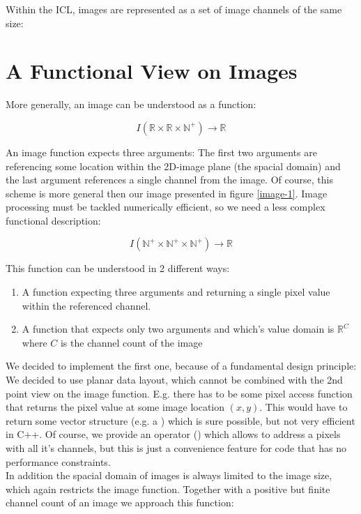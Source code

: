  Within the ICL, images are represented as a set of image channels of the same size:



\section{A Functional View on Images}
More generally, an image can be understood as a function:

\begin{equation}
I(\mathbb{R} \times{} \mathbb{R} \times{} \mathbb{N^+} )\rightarrow\mathbb{R} 
\end{equation}

An image function expects three arguments: The first two arguments are referencing some location within the 2D-image plane (the spacial domain) and the last argument references a single channel from the image. Of course, this scheme is more general then our image presented in figure \ref{image-1}. Image processing must be tackled numerically efficient, so we need a less complex functional description:

\begin{equation}
  I(\mathbb{N^+} \times{} \mathbb{N^+} \times{} \mathbb{N^+} )\rightarrow\mathbb{R} 
\end{equation}


This function can be understood in 2 different ways:
\begin{enumerate}
 \item A function expecting three arguments and returning a single pixel value within the referenced channel.
 \item A function that expects only two arguments and which's value domain is $\mathbb{R}^C$ where $C$ is the channel count of the image
\end{enumerate} 

We decided to implement the first one, because of a fundamental design principle: We decided to use planar data layout, which cannot be combined with the 2nd point view on the image function. E.g. there has to be some pixel access function that returns the pixel value at some image location $(x,y)$. This would have to return some vector structure (e.g. a ) which is sure possible, but not very efficient in C++.
Of course, we provide an operator () which allows to address a pixels with all it's channels, but this is just a convenience feature for code that has no performance constraints.\\
In addition the spacial domain of images is always limited to the image size, which again restricts the image function. Together with a positive but finite channel count of an image we approach this function:

